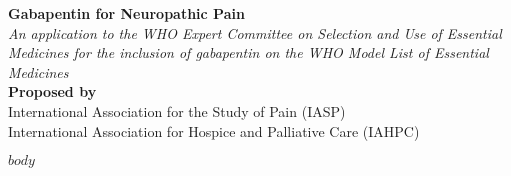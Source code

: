 \documentclass[11pt]{article}
\begin{document}
\begin{center}
\large{\textbf{Gabapentin for Neuropathic Pain}}\\
\vspace{2mm}
\large{\textit{An application to the WHO Expert Committee on Selection and Use of Essential Medicines for the inclusion of gabapentin on the WHO Model List of Essential Medicines}}\\
\vspace{2mm}
\small{\textbf{Proposed by}}\\
\small{International Association for the Study of Pain (IASP)\\ International Association for Hospice and Palliative Care (IAHPC)}
\end{center}

\begin{FlushLeft} %

$body$

\end{FlushLeft}
\end{document}
